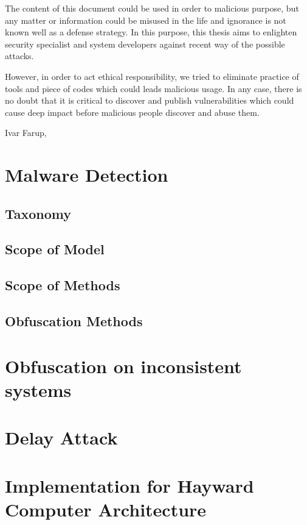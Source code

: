 \documentclass[medieteknikk]{gucmasterthesis}
\begin{document}
The content of this document could be used in order to malicious purpose, but any matter or information could be misused in the life and ignorance is not known well as a defense strategy. In this purpose, this thesis aims to enlighten security specialist and system developers against recent way of the possible attacks. 

However, in order to act ethical responsibility, we tried to eliminate practice of tools and piece of codes which could leads malicious usage. In any case, there is no doubt that it is critical to discover and publish vulnerabilities which could cause deep impact before malicious people discover and abuse them.



\vspace{\baselineskip}
\noindent Ivar Farup, \gucmasterthesisdate
 
\tableofcontents
\listoffigures
\listoftables



\chapter{Malware Detection}
	\section{Taxonomy}
	\section{Scope of Model}
	\section{Scope of Methods}
	\section{Obfuscation Methods}

\chapter{Obfuscation on inconsistent systems}
\chapter{Delay Attack}
\chapter{Implementation for Hayward Computer Architecture}
\end{document}
